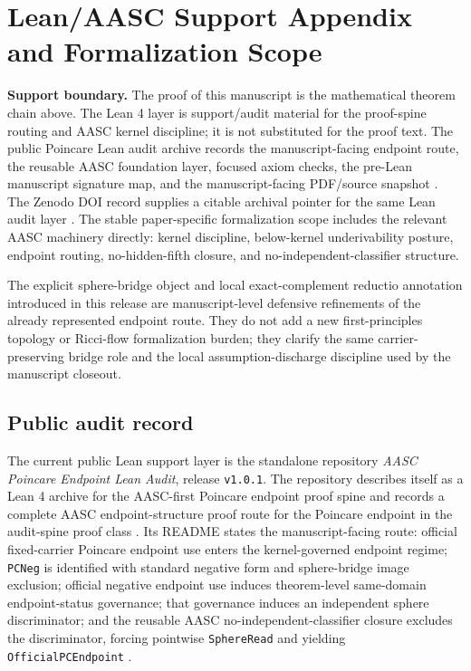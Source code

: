 \documentclass[11pt]{article}
\begin{document}
\section{Lean/AASC Support Appendix and Formalization Scope}

\begin{mdframed}[backgroundcolor=gray!8,linewidth=0.6pt]
\textbf{Support boundary.} The proof of this manuscript is the mathematical theorem chain above. The Lean 4 layer is support/audit material for the proof-spine routing and AASC kernel discipline; it is not substituted for the proof text. The public Poincare Lean audit archive records the manuscript-facing endpoint route, the reusable AASC foundation layer, focused axiom checks, the pre-Lean manuscript signature map, and the manuscript-facing PDF/source snapshot \cite{PoincareLeanAuditGithub2026}. The Zenodo DOI record supplies a citable archival pointer for the same Lean audit layer \cite{PoincareLeanAuditZenodo2026}. The stable paper-specific formalization scope includes the relevant AASC machinery directly: kernel discipline, below-kernel underivability posture, endpoint routing, no-hidden-fifth closure, and no-independent-classifier structure.

The explicit sphere-bridge object and local exact-complement reductio annotation introduced in this release are manuscript-level defensive refinements of the already represented endpoint route. They do not add a new first-principles topology or Ricci-flow formalization burden; they clarify the same carrier-preserving bridge role and the local assumption-discharge discipline used by the manuscript closeout.
\end{mdframed}

\subsection*{Public audit record}
{}

The current public Lean support layer is the standalone repository \emph{AASC Poincare Endpoint Lean Audit}, release \texttt{v1.0.1}. The repository describes itself as a Lean 4 archive for the AASC-first Poincare endpoint proof spine and records a complete AASC endpoint-structure proof route for the Poincare endpoint in the audit-spine proof class \cite{PoincareLeanAuditGithub2026}. Its README states the manuscript-facing route: official fixed-carrier Poincare endpoint use enters the kernel-governed endpoint regime; \texttt{PCNeg} is identified with standard negative form and sphere-bridge image exclusion; official negative endpoint use induces theorem-level same-domain endpoint-status governance; that governance induces an independent sphere discriminator; and the reusable AASC no-independent-classifier closure excludes the discriminator, forcing pointwise \texttt{SphereRead} and yielding \texttt{OfficialPCEndpoint} \cite{PoincareLeanAuditGithub2026}.
\end{document}
